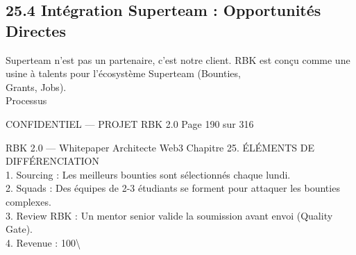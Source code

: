 \documentclass[12pt,landscape,a4paper]{article}
\newenvironment{confidential}
{\begin{tcolorbox}[
    colback=rbkred!5!white,
    colframe=rbkred!75!black,
    title=CONFIDENTIEL,
    fonttitle=\bfseries\color{white},
    coltitle=rbkred!75!black,
    breakable,
    enhanced,
    frame hidden,
    borderline west={2pt}{0pt}{rbkred!75!black}
]}
{\end{tcolorbox}}
\begin{document}
\subsection{25.4 Intégration Superteam : Opportunités Directes}
Superteam n’est pas un partenaire, c’est notre client. RBK est conçu comme une usine à talents pour l’écosystème Superteam (Bounties,\\
Grants, Jobs).\\
\vspace{0.5em}
Processus\\
\vspace{0.5em}
\vspace{0.5em}
\vspace{0.5em}
\begin{confidential}CONFIDENTIEL — PROJET RBK 2.0                                   Page 190 sur 316\end{confidential}
RBK 2.0 — Whitepaper Architecte Web3                                                        Chapitre 25. ÉLÉMENTS DE DIFFÉRENCIATION\\
\vspace{0.5em}
\vspace{0.5em}
1. Sourcing : Les meilleurs bounties sont sélectionnés chaque lundi.\\
\vspace{0.5em}
2. Squads : Des équipes de 2-3 étudiants se forment pour attaquer les bounties complexes.\\
\vspace{0.5em}
3. Review RBK : Un mentor senior valide la soumission avant envoi (Quality Gate).\\
\vspace{0.5em}
4. Revenue : 100\textbackslash{}%
\vspace{0.5em}
\vspace{0.5em}
\end{document}
